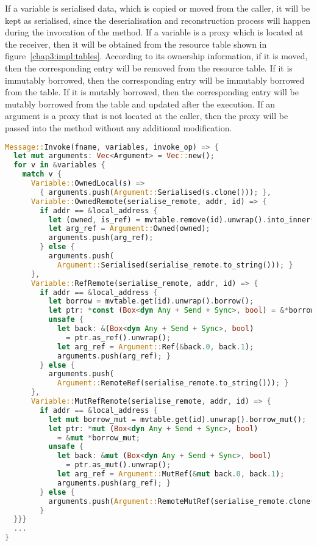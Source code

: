 If a variable is serialised data, which is copied or moved from the caller, it will be kept as serialised, since the deserialisation and reconstruction process will happen during the invocation of the method. 
If a variable is a proxy which is located at the receiver, then it will be obtained from the resource table shown in figure~\ref{chap3:impl:tables}. According to its ownership information, if it is moved, then the corresponding entry will be removed from the resource table. 
If it is immutably borrowed, then the corresponding entry will be immutably borrowed from the table. If it is mutably borrowed, then the corresponding entry will be mutably borrowed from the table and updated after the execution. 
If an argument is a proxy that is not located at the caller, then the proxy will be passed into the method without any additional modification.

\begin{lstlisting}[language=Rust, style=boxed, basicstyle=\footnotesize\ttfamily, caption={Gathering variables from an invocation message}, label=chap3:impl:lst:invoke]
Message::Invoke(fname, variables, invoke_op) => {
  let mut arguments: Vec<Argument> = Vec::new();
  for v in &variables {
    match v {
      Variable::OwnedLocal(s) => 
        { arguments.push(Argument::Serialised(s.clone())); },
      Variable::OwnedRemote(serialise_remote, addr, id) => {
        if addr == &local_address {
          let (owned, is_ref) = mvtable.remove(id).unwrap().into_inner();
          let arg_ref = Argument::Owned(owned);
          arguments.push(arg_ref);
        } else { 
          arguments.push(
            Argument::Serialised(serialise_remote.to_string())); }
      },
      Variable::RefRemote(serialise_remote, addr, id) => {
        if addr == &local_address {
          let borrow = mvtable.get(id).unwrap().borrow();
          let ptr: *const (Box<dyn Any + Send + Sync>, bool) = &*borrow;
          unsafe {
            let back: &(Box<dyn Any + Send + Sync>, bool) 
              = ptr.as_ref().unwrap();
            let arg_ref = Argument::Ref(&back.0, back.1);
            arguments.push(arg_ref); }
        } else { 
          arguments.push(
            Argument::RemoteRef(serialise_remote.to_string())); }
      },
      Variable::MutRefRemote(serialise_remote, addr, id) => {
        if addr == &local_address {
          let mut borrow_mut = mvtable.get(id).unwrap().borrow_mut();
          let ptr: *mut (Box<dyn Any + Send + Sync>, bool)
            = &mut *borrow_mut;
          unsafe {
            let back: &mut (Box<dyn Any + Send + Sync>, bool) 
              = ptr.as_mut().unwrap();
            let arg_ref = Argument::MutRef(&mut back.0, back.1);
            arguments.push(arg_ref); }
        } else { 
          arguments.push(Argument::RemoteMutRef(serialise_remote.clone())); 
        }
  }}}
  ...
}
\end{lstlisting}

